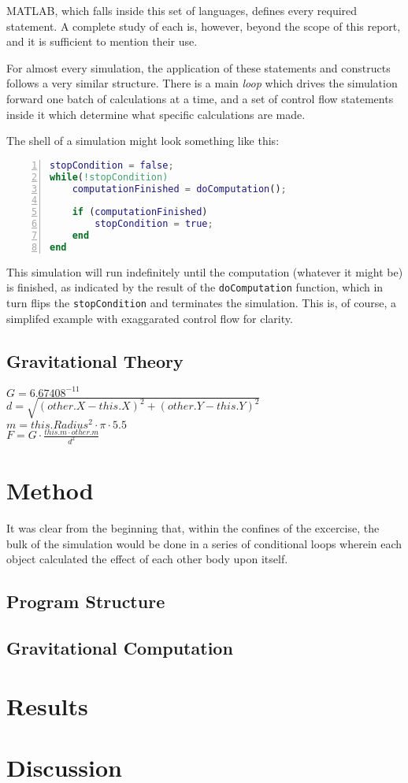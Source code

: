 \documentclass[11pt]{article}
\begin{document}
MATLAB, which falls inside this set of languages, defines every required statement. A complete study of each is, however, beyond the scope of this report, and it is sufficient to mention their use.

For almost every simulation, the application of these statements and constructs follows a very similar structure. There is a main \emph{loop} which drives the simulation forward one batch of calculations at a time, and a set of control flow statements inside it which determine what specific calculations are made.

The shell of a simulation might look something like this:
\begin{lstlisting}[language=Matlab, tabsize=4, numbers=left, frame=shadowbox]
stopCondition = false;
while(!stopCondition)
	computationFinished = doComputation();
	
	if (computationFinished)
		stopCondition = true;
	end
end
\end{lstlisting}
This simulation will run indefinitely until the computation (whatever it might be) is finished, as indicated by
the result of the \verb|doComputation| function, which in turn flips the \verb|stopCondition| and terminates the 
simulation. This is, of course, a simplifed example with exaggarated control flow for clarity.
\subsection{Gravitational Theory}
$G = 6.67408^{-11}$\\
$d = \sqrt{(other.X - this.X)^{2} + (other.Y - this.Y)^{2}}$\\
$m = this.Radius^{2} \cdot \pi \cdot 5.5$\\
$F = G \cdot \frac{this.m \cdot other.m}{d^{2}}$

\section{Method}
It was clear from the beginning that, within the confines of the excercise, the bulk of the simulation would be done in a series of conditional loops wherein each object calculated the effect of each other body upon itself.
\subsection{Program Structure}
\subsection{Gravitational Computation}

\section{Results}


\section{Discussion}

\printbibliography
\end{document}
